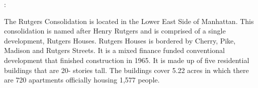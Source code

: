 :    

  

The Rutgers Consolidation is located in the Lower East Side of Manhattan. This consolidation is named after Henry Rutgers and is comprised of a single development, Rutgers Houses. Rutgers Houses is bordered by Cherry, Pike, Madison and Rutgers Streets. It is a mixed finance funded conventional development that finished construction in 1965. It is made up of five residential buildings that are 20- stories tall. The buildings cover 5.22 acres in which there are 720 apartments officially housing 1,577 people.